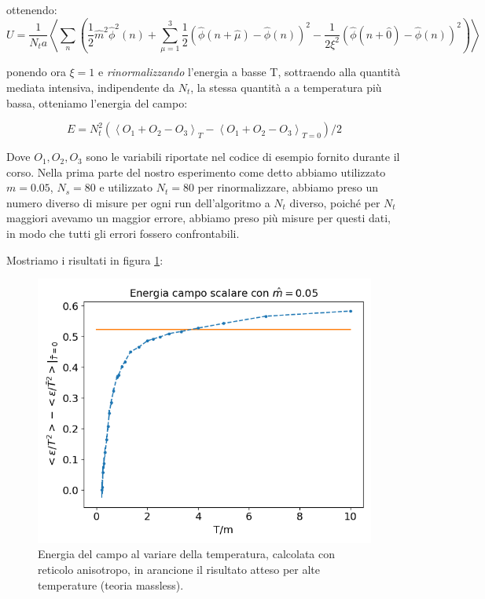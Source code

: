 \documentclass[a4paper, 12pt]{article}
\begin{document}
ottenendo:
\begin{equation}
U = \frac{1}{N_t a} \left< \sum_n \left(\frac{1}{2}\hat{m}^2 \hat{\phi}^2(n) +
\sum_{\mu=1}^3 \frac{1}{2} \left( \hat{\phi}(n+\hat{\mu})- \hat{\phi}(n) \right) ^2
- \frac{1}{2 \xi^2} \left( \hat{\phi}(n+\hat{0})- \hat{\phi}(n) \right)^2 \right)\right>
\end{equation}

ponendo ora $\xi=1$ e \emph{rinormalizzando} l'energia a basse T, sottraendo
alla quantità mediata intensiva, indipendente da $N_t$, la stessa quantità a
a temperatura più bassa, otteniamo l'energia del campo:

\begin{equation}
E = N_t^2 (\left< O_1+O_2-O_3 \right>_T- \left< O_1+O_2-O_3 \right>_{T=0})/2
\end{equation}

Dove $O_1, O_2, O_3$ sono le variabili riportate nel codice di esempio fornito
durante il corso.
Nella prima parte del nostro esperimento come detto abbiamo utilizzato $m=0.05$,
$N_s=80$ e utilizzato $N_t = 80$ per rinormalizzare, abbiamo preso un numero
diverso di misure per ogni run dell'algoritmo a $N_t$ diverso, poiché per
$N_t$ maggiori avevamo un maggior errore, abbiamo preso più misure per questi
dati, in modo che tutti gli errori fossero confrontabili.

Mostriamo i risultati in figura \ref{campo_scalare_massa_fissa}:
\begin{figure}
\includegraphics[width = \linewidth]{../figure/massa_fissa.png}
\caption{Energia del campo al variare della temperatura,
calcolata con reticolo anisotropo, in arancione il risultato atteso
per alte temperature (teoria massless).}
\label{campo_scalare_massa_fissa}
\end{figure}
\end{document}
